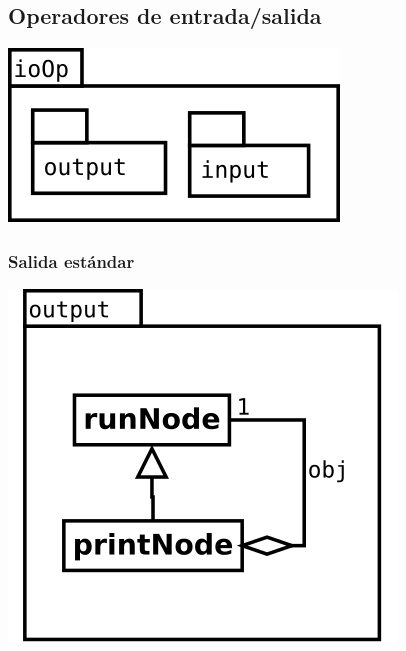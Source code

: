 \pagebreak
\subsection {Operadores de entrada/salida} 
\begin{center}
\includegraphics[scale=0.4]{ioOp-package.png} \\
\end{center}
\subsubsection {Salida estándar} 
\begin{center}
\includegraphics[scale=0.4]{output.png} \\
\end{center}
